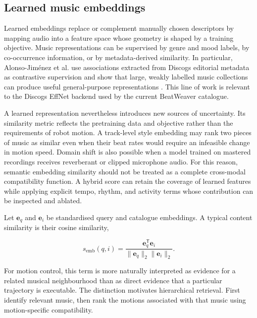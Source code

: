 \subsection{Learned music embeddings}
\label{subsec:lit_learned_embeddings}

Learned embeddings replace or complement manually chosen descriptors by mapping
audio into a feature space whose geometry is shaped by a training objective.
Music representations can be supervised by genre and mood labels, by
co-occurrence information, or by metadata-derived similarity. In particular,
Alonso-Jim\'enez et al. use associations extracted from Discogs editorial
metadata as contrastive supervision and show that large, weakly labelled music
collections can produce useful general-purpose representations
\cite{alonso2022music}. This line of work is relevant to the Discogs EffNet
backend used by the current BeatWeaver catalogue.

A learned representation nevertheless introduces new sources of uncertainty.
Its similarity metric reflects the pretraining data and objective rather than
the requirements of robot motion. A track-level style embedding may rank two
pieces of music as similar even when their beat rates would require an
infeasible change in motion speed. Domain shift is also possible when a model
trained on mastered recordings receives reverberant or clipped microphone
audio. For this reason, semantic embedding similarity should not be treated as
a complete cross-modal compatibility function. A hybrid score can retain the
coverage of learned features while applying explicit tempo, rhythm, and
activity terms whose contribution can be inspected and ablated.

Let $\mathbf{e}_q$ and $\mathbf{e}_i$ be standardised query and catalogue
embeddings. A typical content similarity is their cosine similarity,

\begin{equation}
    s_{\mathrm{emb}}(q,i)
    = \frac{\mathbf{e}_q^{\mathsf{T}}\mathbf{e}_i}
           {\lVert\mathbf{e}_q\rVert_2\lVert\mathbf{e}_i\rVert_2}.
\end{equation}

For motion control, this term is more naturally interpreted as evidence for a
related musical neighbourhood than as direct evidence that a particular
trajectory is executable. The distinction motivates hierarchical retrieval.
First identify relevant music, then rank the motions associated with that music
using motion-specific compatibility.

